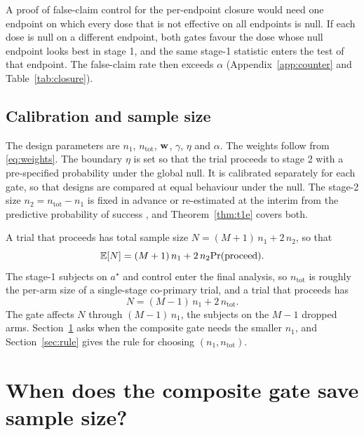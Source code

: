 \begin{remark}\label{rem:perendpoint}
A proof of false-claim control for the per-endpoint closure would need one endpoint on which every dose that is not effective on all endpoints is null. If each dose is null on a different endpoint, both gates favour the dose whose null endpoint looks best in stage 1, and the same stage-1 statistic enters the test of that endpoint. The false-claim rate then exceeds $\alpha$ (Appendix~\ref{app:counter} and Table~\ref{tab:closure}).
\end{remark}

\subsection{Calibration and sample size}\label{sec:calib}

The design parameters are $n_1$, $n_{\mathrm{tot}}$, $\mathbf{w}$, $\gamma$, $\eta$ and $\alpha$. The weights follow from \eqref{eq:weights}. The boundary $\eta$ is set so that the trial proceeds to stage 2 with a pre-specified probability under the global null. It is calibrated separately for each gate, so that designs are compared at equal behaviour under the null. The stage-2 size $n_2=n_{\mathrm{tot}}-n_1$ is fixed in advance or re-estimated at the interim from the predictive probability of success \citep{yang2024,li2024}, and Theorem~\ref{thm:t1e} covers both.

A trial that proceeds has total sample size $N=(M+1)\,n_1+2\,n_2$, so that
\begin{equation}\label{eq:EN}
\mathbb{E}[N]=(M+1)\,n_1+2\,n_2\mathrm{Pr}(\text{proceed}).
\end{equation}
The stage-1 subjects on $a^\star$ and control enter the final analysis, so $n_{\mathrm{tot}}$ is roughly the per-arm size of a single-stage co-primary trial, and a trial that proceeds has
\begin{equation}\label{eq:accounting}
N=(M-1)\,n_1+2\,n_{\mathrm{tot}}.
\end{equation}
The gate affects $N$ through $(M-1)\,n_1$, the subjects on the $M-1$ dropped arms. Section~\ref{sec:saving} asks when the composite gate needs the smaller $n_1$, and Section~\ref{sec:rule} gives the rule for choosing $(n_1,n_{\mathrm{tot}})$.

\section{When does the composite gate save sample size?}\label{sec:saving}


